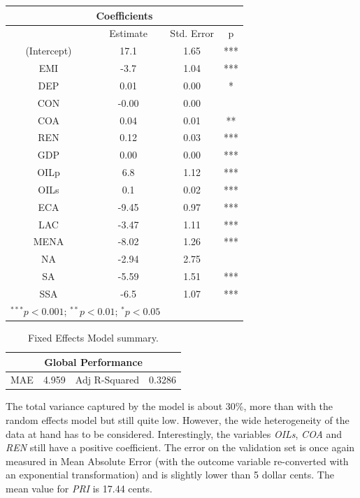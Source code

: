\documentclass[a4paper,12pt]{book}
\begin{document}
\begin{table}[tb]
\begin{center}
\begin{tabular}{|c|c|c|c|}
\hline
\multicolumn{4}{|c|}{Coefficients}\\
\hline
&Estimate&Std. Error&p\\
\hline
(Intercept)&17.1&1.65&***\\
EMI&-3.7&1.04&***\\
DEP&0.01&0.00&*\\
CON&-0.00&0.00&\\
COA&0.04&0.01&**\\
REN&0.12&0.03&***\\
GDP&0.00&0.00&***\\
OILp&6.8&1.12&***\\
OILs&0.1&0.02&***\\
ECA&-9.45&0.97&***\\
LAC&-3.47&1.11&***\\
MENA&-8.02&1.26&***\\
NA&-2.94&2.75&\\
SA&-5.59&1.51&***\\
SSA&-6.5&1.07&***\\
\hline
\multicolumn{2}{l}{\scriptsize{$^{***}p<0.001$; $^{**}p<0.01$; $^{*}p<0.05$}}\\
\end{tabular}
\end{center}
\end{table}
\begin{table}[tb]
\begin{center}
\begin{tabular}{|c|c|c|c|}
\hline
\multicolumn{4}{|c|}{Global Performance}\\
\hline
MAE&4.959&Adj R-Squared&0.3286\\
\hline
\end{tabular}
\caption{Fixed Effects Model summary.}
\label{Tab:xx}
\end{center}
\end{table}

The total variance captured by the model is about 30\%, more than with the random effects model but still quite low. However, the wide heterogeneity of the data at hand has to be considered. Interestingly, the variables \textit{OILs}, \textit{COA} and \textit{REN} still have a positive coefficient. The error on the validation set is once again measured in Mean Absolute Error (with the outcome variable re-converted with an exponential transformation) and is slightly lower than 5 dollar cents. The mean value for \textit{PRI} is 17.44 cents.
\end{document}
